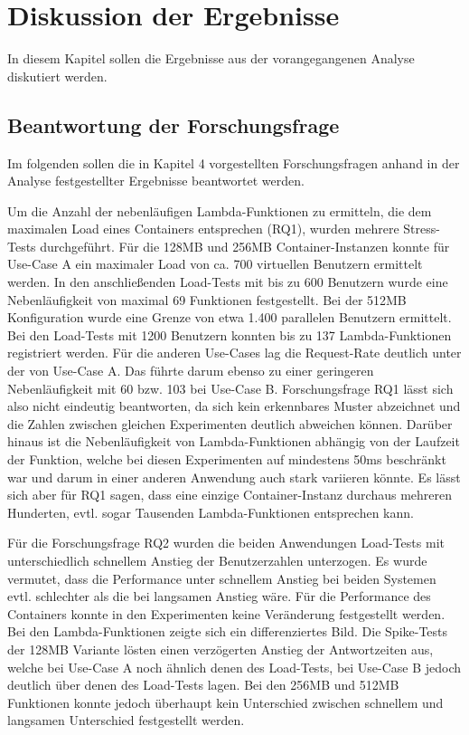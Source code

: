 \chapter{Diskussion der Ergebnisse}
In diesem Kapitel sollen die Ergebnisse aus der vorangegangenen Analyse diskutiert werden.

\section{Beantwortung der Forschungsfrage}
Im folgenden sollen die in Kapitel 4 vorgestellten Forschungsfragen anhand in der Analyse festgestellter Ergebnisse beantwortet werden.

Um die Anzahl der nebenläufigen Lambda-Funktionen zu ermitteln, die dem maximalen Load eines Containers entsprechen (RQ1), wurden mehrere Stress-Tests durchgeführt. Für die 128MB und 256MB Container-Instanzen konnte für Use-Case A ein maximaler Load von ca. 700 virtuellen Benutzern ermittelt werden. In den anschließenden Load-Tests mit bis zu 600 Benutzern wurde eine Nebenläufigkeit von maximal 69 Funktionen festgestellt. Bei der 512MB Konfiguration wurde eine Grenze von etwa 1.400 parallelen Benutzern ermittelt. Bei den Load-Tests mit 1200 Benutzern konnten bis zu 137 Lambda-Funktionen registriert werden. 
Für die anderen Use-Cases lag die Request-Rate deutlich unter der von Use-Case A. Das führte darum ebenso zu einer geringeren Nebenläufigkeit mit 60 bzw. 103 bei Use-Case B. 
Forschungsfrage RQ1 lässt sich also nicht eindeutig beantworten, da sich kein erkennbares Muster abzeichnet und die Zahlen zwischen gleichen Experimenten deutlich abweichen können. Darüber hinaus ist die Nebenläufigkeit von Lambda-Funktionen abhängig von der Laufzeit der Funktion, welche bei diesen Experimenten auf mindestens 50ms beschränkt war und darum in einer anderen Anwendung auch stark variieren könnte. Es lässt sich aber für RQ1 sagen, dass eine einzige Container-Instanz durchaus mehreren Hunderten, evtl. sogar Tausenden Lambda-Funktionen entsprechen kann.

Für die Forschungsfrage RQ2 wurden die beiden Anwendungen Load-Tests mit unterschiedlich schnellem Anstieg der Benutzerzahlen unterzogen. Es wurde vermutet, dass die Performance unter schnellem Anstieg bei beiden Systemen evtl. schlechter als die bei langsamen Anstieg wäre. Für die Performance des Containers konnte in den Experimenten keine Veränderung festgestellt werden. Bei den Lambda-Funktionen zeigte sich ein differenziertes Bild. Die Spike-Tests der 128MB Variante lösten einen verzögerten Anstieg der Antwortzeiten aus, welche bei Use-Case A noch ähnlich denen des Load-Tests, bei Use-Case B jedoch deutlich über denen des Load-Tests lagen. Bei den 256MB und 512MB Funktionen konnte jedoch überhaupt kein Unterschied zwischen schnellem und langsamen Unterschied festgestellt werden. 

